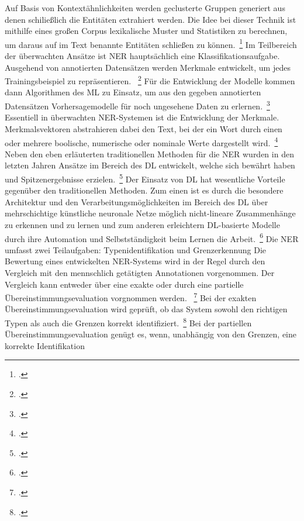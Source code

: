 Auf Basis von Kontextähnlichkeiten werden geclusterte Gruppen generiert aus denen schiließlich die
Entitäten extrahiert werden.
Die Idee bei dieser Technik ist mithilfe eines großen Corpus lexikalische Muster und Statistiken zu berechnen, um daraus
auf im Text benannte Entitäten schließen zu können.~\footcite[\vglf][]{li.2020}\newline
Im Teilbereich der überwachten Ansätze ist \ac{NER} hauptsächlich eine Klassifikationsaufgabe.
Ausgehend von annotierten Datensätzen werden Merkmale entwickelt, um jedes Trainingsbeispiel zu repräsentieren.
~\footcite[\vglf][]{li.2020}
Für die Entwicklung der Modelle kommen dann Algorithmen des \ac{ML} zu Einsatz, um aus den gegeben annotierten
Datensätzen Vorhersagemodelle für noch ungesehene Daten zu erlernen.~\footcite[\vglf][]{li.2020}
Essentiell in überwachten \ac{NER}-Systemen ist die Entwicklung der Merkmale.
Merkmalsvektoren abstrahieren dabei den Text, bei der ein Wort durch einen oder mehrere boolische, numerische oder
nominale Werte dargestellt wird.~\footcite[\vglf][]{nadeau.2007}\newline
Neben den eben erläuterten traditionellen Methoden für die \ac{NER} wurden in den letzten Jahren Ansätze im Bereich des
\ac{DL} entwickelt, welche sich bewährt haben und Spitzenergebnisse erzielen.~\footcite[\vglf][]{li.2020}
Der Einsatz von \ac{DL} hat wesentliche Vorteile gegenüber den traditionellen Methoden.
Zum einen ist es durch die besondere Architektur und den Verarbeitungsmöglichkeiten im Bereich des \ac{DL} über
mehrschichtige künstliche neuronale Netze möglich nicht-lineare Zusammenhänge zu erkennen und zu lernen und zum anderen
erleichtern \ac{DL}-basierte Modelle durch ihre Automation und Selbstständigkeit beim Lernen die Arbeit.~\footcite
[\vglf][]{li.2020}\newline
\newline
Die \ac{NER} umfasst zwei Teilaufgaben: Typenidentifikation und Grenzerkennung
Die Bewertung eines entwickelten \ac{NER}-Systems wird in der Regel durch den Vergleich mit den mennschlich getätigten
Annotationen vorgenommen.
Der Vergleich kann entweder über eine exakte oder durch eine partielle Übereinstimmungsevaluation vorgnommen werden.
~\footcite[\vglf][ f.]{li.2020}
Bei der exakten Übereinstimmungsevaluation wird geprüft, ob das System sowohl den richtigen Typen als auch die Grenzen
korrekt identifiziert.~\footcite[\vglf][]{tjongkimsang.2003}
Bei der partiellen Übereinstimmungsevaluation genügt es, wenn, unabhängig von den Grenzen, eine korrekte Identifikation
